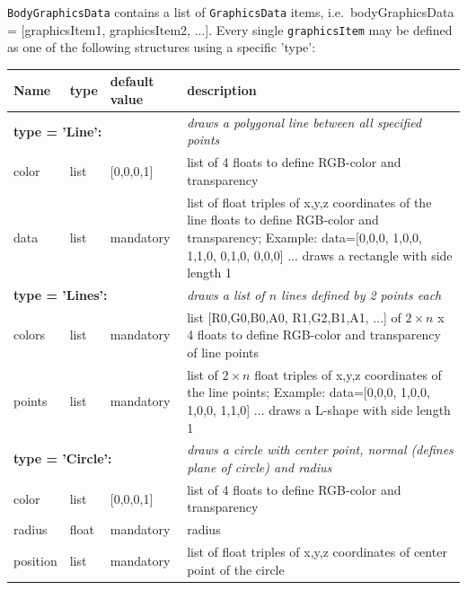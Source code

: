 \texttt{BodyGraphicsData} contains a list of \texttt{GraphicsData} items, i.e.\ bodyGraphicsData = [graphicsItem1, graphicsItem2, ...]. Every single \texttt{graphicsItem} may be defined as one of the following structures using a specific 'type':
\begin{center}
  \footnotesize
  \begin{longtable}{| p{3cm} | p{2cm} | p{3cm} | p{7.5cm} |} 
	\hline
  \bf Name & \bf type & \bf default value & \bf description \\ \hline
%
	\multicolumn{3}{l}{\parbox{8cm}{\bf type = 'Line': }} & \multicolumn{1}{l}{\parbox{7.5cm}{\it draws a polygonal line between all specified points}}\\ \hline
  color & list & [0,0,0,1] & list of 4 floats to define RGB-color and transparency\\ \hline
  data & list &  mandatory & list of float triples of x,y,z coordinates of the line floats to define RGB-color and transparency; Example: data=[0,0,0, 1,0,0, 1,1,0, 0,1,0, 0,0,0] ... draws a rectangle with side length 1\\ \hline
%
	\multicolumn{3}{l}{\parbox{8cm}{\bf type = 'Lines': }} & \multicolumn{1}{l}{\parbox{7.5cm}{\it draws a list of $n$ lines defined by 2 points each}}\\ \hline
  colors & list & mandatory & list [R0,G0,B0,A0, R1,G2,B1,A1, ...] of $2\times n$ x 4 floats to define RGB-color and transparency of line points\\ \hline
  points & list &  mandatory & list of $2 \times n$ float triples of x,y,z coordinates of the line points; Example: data=[0,0,0, 1,0,0, 1,0,0, 1,1,0] ... draws a L-shape with side length 1\\ \hline
%
	\multicolumn{3}{l}{\parbox{8cm}{\bf type = 'Circle': }} & \multicolumn{1}{l}{\parbox{7.5cm}{\it draws a circle with center point, normal (defines plane of circle) and radius}}\\ \hline
  color & list & [0,0,0,1] & list of 4 floats to define RGB-color and transparency\\ \hline
  radius & float & mandatory & radius\\ \hline
  position & list & mandatory & list of float triples of x,y,z coordinates of center point of the circle\\ \hline

\end{longtable}
\end{center}
